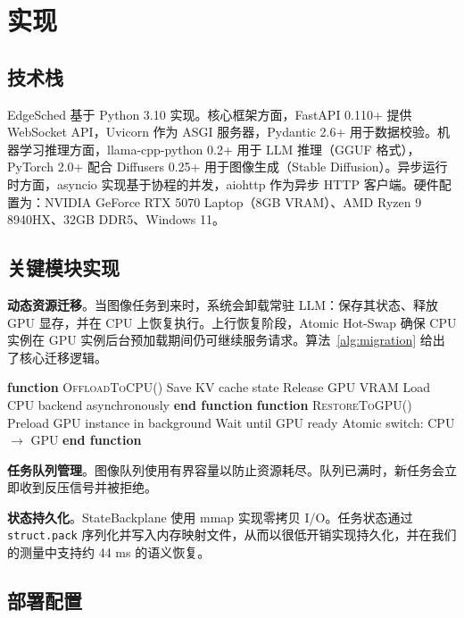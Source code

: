 \section{实现}
\label{sec:implementation}

\subsection{技术栈}

EdgeSched 基于 Python 3.10 实现。核心框架方面，FastAPI 0.110+ 提供 WebSocket API，Uvicorn 作为 ASGI 服务器，Pydantic 2.6+ 用于数据校验。机器学习推理方面，llama-cpp-python 0.2+ 用于 LLM 推理（GGUF 格式），PyTorch 2.0+ 配合 Diffusers 0.25+ 用于图像生成（Stable Diffusion）。异步运行时方面，asyncio 实现基于协程的并发，aiohttp 作为异步 HTTP 客户端。硬件配置为：NVIDIA GeForce RTX 5070 Laptop（8GB VRAM）、AMD Ryzen 9 8940HX、32GB DDR5、Windows 11。

\subsection{关键模块实现}

\textbf{动态资源迁移}。当图像任务到来时，系统会卸载常驻 LLM：保存其状态、释放 GPU 显存，并在 CPU 上恢复执行。上行恢复阶段，Atomic Hot-Swap 确保 CPU 实例在 GPU 实例后台预加载期间仍可继续服务请求。算法~\ref{alg:migration} 给出了核心迁移逻辑。

\begin{algorithm}[!t]
\caption{动态 GPU-CPU 迁移}
\label{alg:migration}
\begin{algorithmic}[1]
\STATE \textbf{function} \textsc{OffloadToCPU}()
\STATE \quad Save KV cache state
\STATE \quad Release GPU VRAM
\STATE \quad Load CPU backend asynchronously
\STATE \textbf{end function}
\STATE
\STATE \textbf{function} \textsc{RestoreToGPU}()
\STATE \quad Preload GPU instance in background
\STATE \quad Wait until GPU ready
\STATE \quad Atomic switch: CPU $\rightarrow$ GPU
\STATE \textbf{end function}
\end{algorithmic}
\end{algorithm}

\textbf{任务队列管理}。图像队列使用有界容量以防止资源耗尽。队列已满时，新任务会立即收到反压信号并被拒绝。

\textbf{状态持久化}。StateBackplane 使用 mmap 实现零拷贝 I/O。任务状态通过 \texttt{struct.pack} 序列化并写入内存映射文件，从而以很低开销实现持久化，并在我们的测量中支持约 44 ms 的语义恢复。

\subsection{部署配置}


